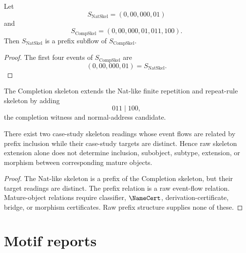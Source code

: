 \begin{proposition}
\label{prop:case-studies-nat-prefix-completion}
Let
$$
  S_{\mathrm{NatSkel}}=(0,00,000,01)
$$
and
$$
  S_{\mathrm{CompSkel}}=(0,00,000,01,011,100).
$$
Then $S_{\mathrm{NatSkel}}$ is a prefix subflow of $S_{\mathrm{CompSkel}}$.
\end{proposition}

\begin{proof}
The first four events of $S_{\mathrm{CompSkel}}$ are
$$
  (0,00,000,01)=S_{\mathrm{NatSkel}}.
$$
\end{proof}

\begin{corollary}
\label{cor:case-studies-completion-extends-nat}
The Completion skeleton extends the Nat-like finite repetition and repeat-rule skeleton by adding
$$
  011\mid 100,
$$
the completion witness and normal-address candidate.
\end{corollary}

\begin{theorem}
\label{thm:case-studies-skeleton-extension-not-object-extension}
There exist two case-study skeleton readings whose event flows are related by prefix inclusion while their case-study targets are distinct. Hence raw skeleton extension alone does not determine inclusion, subobject, subtype, extension, or morphism between corresponding mature objects.
\end{theorem}

\begin{proof}
The Nat-like skeleton is a prefix of the Completion skeleton, but their target readings are distinct. The prefix relation is a raw event-flow relation. Mature-object relations require classifier, $\NameCert$, derivation-certificate, bridge, or morphism certificates. Raw prefix structure supplies none of these.
\end{proof}

\section{Motif reports}
\label{sec:case-studies-motif-reports}


